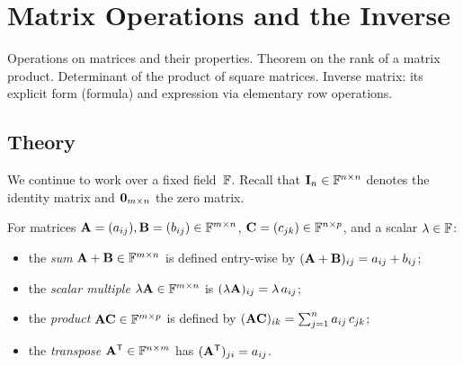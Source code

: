 
\section{Matrix Operations and the Inverse}
\label{sec:1.1.03-matrix-operations}

\begin{ticket}
Operations on matrices and their properties. Theorem on the rank of a matrix product. Determinant of the product of square matrices. Inverse matrix: its explicit form (formula) and expression via elementary row operations.
\end{ticket}

\subsection*{Theory}

We continue to work over a fixed field~$\mathbb{F}$. Recall that
$\mathbf{I}_n \in \mathbb{F}^{n \times n}$ denotes the identity matrix and
$\mathbf{0}_{m \times n}$ the zero matrix.

\begin{definition}
\label{def:matrix-ops}
For matrices $\mathbf{A} = (a_{ij}), \mathbf{B} = (b_{ij}) \in \mathbb{F}^{m \times n}$,
$\mathbf{C} = (c_{jk}) \in \mathbb{F}^{n \times p}$, and a scalar $\lambda \in \mathbb{F}$:
\begin{itemize}
  \item the \emph{sum} $\mathbf{A} + \mathbf{B} \in \mathbb{F}^{m \times n}$ is
        defined entry-wise by $(\mathbf{A} + \mathbf{B})_{ij} = a_{ij} + b_{ij}$;
  \item the \emph{scalar multiple} $\lambda \mathbf{A} \in \mathbb{F}^{m \times n}$
        is $(\lambda \mathbf{A})_{ij} = \lambda \, a_{ij}$;
  \item the \emph{product} $\mathbf{A}\mathbf{C} \in \mathbb{F}^{m \times p}$ is
        defined by
        $(\mathbf{A}\mathbf{C})_{ik} = \sum_{j=1}^{n} a_{ij}\,c_{jk}$;
  \item the \emph{transpose} $\mathbf{A}^{\mathsf{T}} \in \mathbb{F}^{n \times m}$ has
        $(\mathbf{A}^{\mathsf{T}})_{ji} = a_{ij}$.
\end{itemize}
\end{definition}


